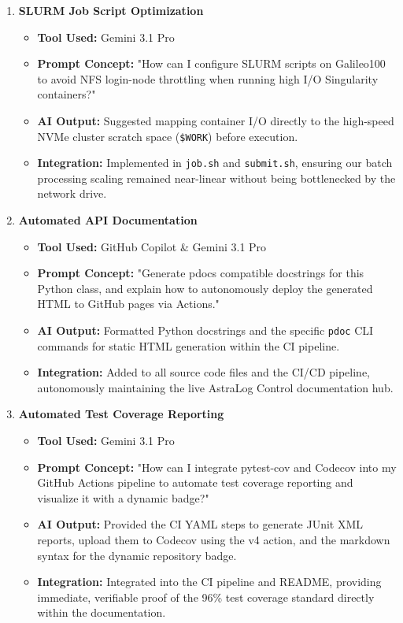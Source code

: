 \documentclass[11pt, a4paper]{article}
\begin{document}
\begin{enumerate}[label=\textbf{Topic \arabic*:}, align=left, leftmargin=0.5cm]
    \item \textbf{SLURM Job Script Optimization}
    \begin{itemize}[label={}, leftmargin=0.5cm]
        \item \textbf{Tool Used:} Gemini 3.1 Pro
        \item \textbf{Prompt Concept:} "How can I configure SLURM scripts on Galileo100 to avoid NFS login-node throttling when running high I/O Singularity containers?"
        \item \textbf{AI Output:} Suggested mapping container I/O directly to the high-speed NVMe cluster scratch space (\texttt{\$WORK}) before execution.
        \item \textbf{Integration:} Implemented in \texttt{job.sh} and \texttt{submit.sh}, ensuring our batch processing scaling remained near-linear without being bottlenecked by the network drive.
    \end{itemize}
    \vspace{0.3cm}

    \item \textbf{Automated API Documentation}
    \begin{itemize}[label={}, leftmargin=0.5cm]
        \item \textbf{Tool Used:} GitHub Copilot \& Gemini 3.1 Pro
        \item \textbf{Prompt Concept:} "Generate pdocs compatible docstrings for this Python class, and explain how to autonomously deploy the generated HTML to GitHub pages via Actions."
        \item \textbf{AI Output:} Formatted Python docstrings and the specific \texttt{pdoc} CLI commands for static HTML generation within the CI pipeline.
        \item \textbf{Integration:} Added to all source code files and the CI/CD pipeline, autonomously maintaining the live AstraLog Control documentation hub.
    \end{itemize}

    \item \textbf{Automated Test Coverage Reporting}
    \begin{itemize}[label={}, leftmargin=0.5cm]
        \item \textbf{Tool Used:} Gemini 3.1 Pro
        \item \textbf{Prompt Concept:} "How can I integrate pytest-cov and Codecov into my GitHub Actions pipeline to automate test coverage reporting and visualize it with a dynamic badge?"
        \item \textbf{AI Output:} Provided the CI YAML steps to generate JUnit XML reports, upload them to Codecov using the v4 action, and the markdown syntax for the dynamic repository badge.
        \item \textbf{Integration:} Integrated into the CI pipeline and README, providing immediate, verifiable proof of the 96\% test coverage standard directly within the documentation.
    \end{itemize}
    \vspace{0.3cm}


\end{enumerate}
\end{document}
